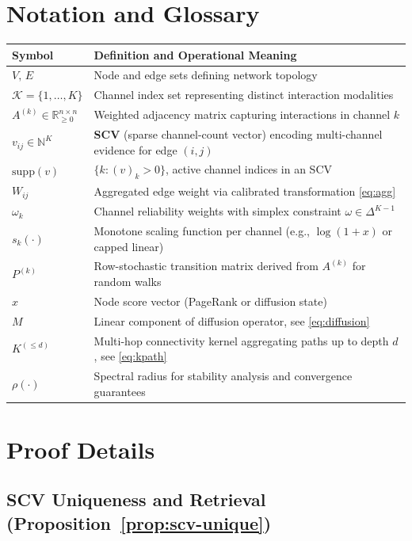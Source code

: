 \documentclass[12pt]{article}
\theoremstyle{plain}
\begin{document}
\section{Notation and Glossary}
\label{app:glossary}
\begin{center}
\small
\begin{tabular}{p{3.4cm} p{11.2cm}}
\toprule
\textbf{Symbol} & \textbf{Definition and Operational Meaning} \\
\midrule
$V,\,E$ & Node and edge sets defining network topology \\
$\mathcal{K}=\{1,\dots,K\}$ & Channel index set representing distinct interaction modalities \\
$A^{(k)}\in\mathbb{R}_{\ge0}^{n\times n}$ & Weighted adjacency matrix capturing interactions in channel $k$ \\
$v_{ij}\in\mathbb{N}^K$ & \textbf{SCV} (sparse channel-count vector) encoding multi-channel evidence for edge $(i,j)$ \\
$\mathrm{supp}(v)$ & $\{k:(v)_k>0\}$, active channel indices in an SCV \\
$W_{ij}$ & Aggregated edge weight via calibrated transformation \eqref{eq:agg} \\
$\omega_k$ & Channel reliability weights with simplex constraint $\omega\in\Delta^{K-1}$ \\
$s_k(\cdot)$ & Monotone scaling function per channel (e.g., $\log(1+x)$ or capped linear) \\
$P^{(k)}$ & Row-stochastic transition matrix derived from $A^{(k)}$ for random walks \\
$x$ & Node score vector (PageRank or diffusion state) \\
$M$ & Linear component of diffusion operator, see \eqref{eq:diffusion} \\
$K^{(\le d)}$ & Multi-hop connectivity kernel aggregating paths up to depth $d$, see \eqref{eq:kpath} \\
$\rho(\cdot)$ & Spectral radius for stability analysis and convergence guarantees \\
\bottomrule
\end{tabular}
\end{center}

\section{Proof Details}
\label{app:proofs}

\subsection{SCV Uniqueness and Retrieval (Proposition~\ref{prop:scv-unique})}
\end{document}
